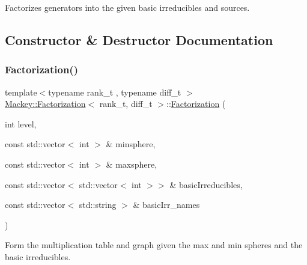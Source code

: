 Factorizes generators into the given basic irreducibles and sources. 

\subsection{Constructor \& Destructor Documentation}
\mbox{\label{classMackey_1_1Factorization_af1b07ab5021c4e51698c4cd3fbb85422}} 
\subsubsection{\texorpdfstring{Factorization()}{Factorization()}\hspace{0.1cm}{\footnotesize\ttfamily [1/2]}}
{\footnotesize\ttfamily template$<$typename rank\+\_\+t , typename diff\+\_\+t $>$ \\
\hyperlink{classMackey_1_1Factorization}{Mackey\+::\+Factorization}$<$ rank\+\_\+t, diff\+\_\+t $>$\+::\hyperlink{classMackey_1_1Factorization}{Factorization} (\begin{DoxyParamCaption}\item[{int}]{level,  }\item[{const std\+::vector$<$ int $>$ \&}]{minsphere,  }\item[{const std\+::vector$<$ int $>$ \&}]{maxsphere,  }\item[{const std\+::vector$<$ std\+::vector$<$ int $>$$>$ \&}]{basic\+Irreducibles,  }\item[{const std\+::vector$<$ std\+::string $>$ \&}]{basic\+Irr\+\_\+names }\end{DoxyParamCaption})}



Form the multiplication table and graph given the max and min spheres and the basic irreducibles. 

\mbox{\label{classMackey_1_1Factorization_a4d55bc1d6f94bdbcd365ed1bb0eaa2cb}} 
